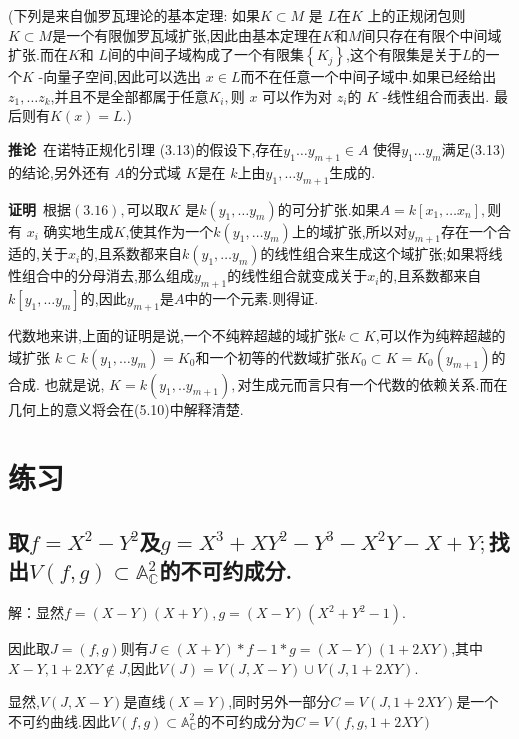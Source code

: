 \documentclass[UTF8]{book}
\begin{document}
		
		(下列是来自伽罗瓦理论的基本定理: 如果$K \subset M$ 是 $L$在$K$ 上的正规闭包则 $K \subset M$是一个有限伽罗瓦域扩张,因此由基本定理在$K$和$M$间只存在有限个中间域扩张.而在$K$和 $L$间的中间子域构成了一个有限集$\left\{ K _{ j }\right\}$,这个有限集是关于$ L $的一个$K$ -向量子空间,因此可以选出 $x \in L$而不在任意一个中间子域中.如果已经给出$z_{1}, \ldots z_{k}$,并且不是全部都属于任意$K _{ i },$则 $x$ 可以作为对 $z _{ i } $的 $K$ -线性组合而表出. 最后则有$K (x )= L$.)
		
		
		\textbf{推论}\  在诺特正规化引理 (3.13)的假设下,存在$y_{1} \ldots y_{m+1} \in A$ 使得$y_{1} \ldots y_{m}$满足(3.13)的结论,另外还有 $A$的分式域 $K$是在 $k$上由$y _{1}, \ldots y _{ m +1}$生成的.
		
		
		\textbf{证明}\ 根据$(3.16),$可以取$K$ 是$k \left(y _{1}, \ldots y _{ m }\right) $的可分扩张.如果$A = k \left[ x _{1}, \ldots x _{ n }\right],$则有 $x _{ i }$ 确实地生成$K$,使其作为一个$k \left(y _{1}, \ldots y _{ m }\right)$上的域扩张,所以对$y _{ m +1}$存在一个合适的,关于$x _{i}$的,且系数都来自$k \left(y _{1}, \ldots y _{ m }\right) $的线性组合来生成这个域扩张;如果将线性组合中的分母消去,那么组成$y _{ m +1}$的线性组合就变成关于$x _{i}$的,且系数都来自$k [  y _{1}, \ldots y _{ m } ] $的,因此$y _{ m +1}$是$ A $中的一个元素.则得证.
		
		
		代数地来讲,上面的证明是说,一个不纯粹超越的域扩张$k \subset K $,可以作为纯粹超越的域扩张 $k \subset k \left(y _{1}, \ldots y _{ m }\right)= K _{0}$和一个初等的代数域扩张$K _{0} \subset K = K _{0}\left(y _{ m +1}\right) $的合成. 也就是说, $K = k \left(y _{1}, . . y _{ m +1}\right),$对生成元而言只有一个代数的依赖关系.而在几何上的意义将会在(5.10)中解释清楚.
		
		
	\section*{练习}
		\subsection{取$f=X^{2}-Y^{2}$及$g=X^{3}+X Y^{2}-Y^{3}-X^{2} Y-X+Y ;$找出$V ( f , g ) \subset \mathbb{A} ^{2}_\mathbb{C}$的不可约成分.}
		
		
			解：显然$ f = (X-Y)(X+Y) ,g = (X - Y) (X^{2} + Y^{2} - 1)$.
			
			
			因此取$ J = (f,g) $则有$ J \in (X+Y)*f - 1*g = (X - Y) (1 + 2 X Y) $,其中$ X-Y,1+2XY \notin J $,因此$ V(J) = V(J,X-Y) \cup V(J,1+2XY) $.
			
			
			显然,$ V(J,X-Y) $是直线$ (X = Y) $,同时另外一部分$ C = V(J,1+2XY) $是一个不可约曲线.因此$V ( f , g ) \subset \mathbb{A} ^{2}_\mathbb{C}$的不可约成分为$ C = V(f , g,1+2XY) $
			
\end{document}
